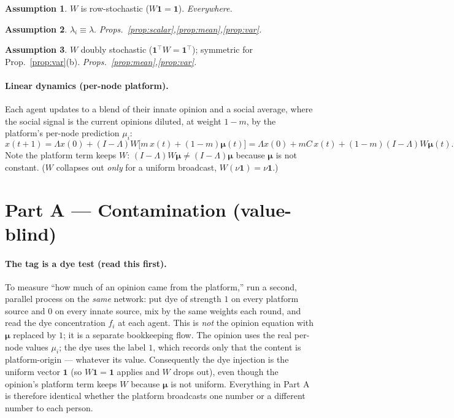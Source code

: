 \documentclass[11pt]{article}
\theoremstyle{definition}
\newtheorem{assumption}{Assumption}
\newcommand{\one}{\mathbf{1}}
\begin{document}
\begin{assumption}\label{a:row} $W$ is row-stochastic ($W\one=\one$). \emph{Everywhere.}\end{assumption}
\begin{assumption}\label{a:unif} $\lambda_i\equiv\lambda$. \emph{Props.~\ref{prop:scalar},\ref{prop:mean},\ref{prop:var}.}\end{assumption}
\begin{assumption}\label{a:ds} $W$ doubly stochastic ($\one^{\!\top}W=\one^{\!\top}$); symmetric for Prop.~\ref{prop:var}(b). \emph{Props.~\ref{prop:mean},\ref{prop:var}.}\end{assumption}

\paragraph{Linear dynamics (per-node platform).} Each agent updates to a blend of their
innate opinion and a social average, where the social signal is the current opinions
diluted, at weight $1-m$, by the platform's per-node prediction $\mu_i$:
\begin{equation}\label{eq:lin}
x(t+1)=\Lambda x(0)+(I-\Lambda)W\big[m\,x(t)+(1-m)\bm{\mu}(t)\big]
       =\Lambda x(0)+mC\,x(t)+(1-m)(I-\Lambda)W\bm{\mu}(t).
\end{equation}
Note the platform term keeps $W$: $(I-\Lambda)W\bm{\mu}\neq(I-\Lambda)\bm{\mu}$ because
$\bm{\mu}$ is not constant. ($W$ collapses out \emph{only} for a uniform broadcast,
$W(\nu\one)=\nu\one$.)

\section{Part A --- Contamination (value-blind)}

\paragraph{The tag is a dye test (read this first).} To measure ``how much of an
opinion came from the platform,'' run a second, parallel process on the \emph{same}
network: put dye of strength $1$ on every platform source and $0$ on every innate
source, mix by the same weights each round, and read the dye concentration $f_i$ at each
agent. This is \emph{not} the opinion equation with $\bm{\mu}$ replaced by $1$; it is a
separate bookkeeping flow. The opinion uses the real per-node values $\mu_i$; the dye
uses the label $1$, which records only that the content is platform-origin --- whatever
its value. Consequently the dye injection is the uniform vector $\one$ (so $W\one=\one$
applies and $W$ drops out), even though the opinion's platform term keeps $W$ because
$\bm{\mu}$ is not uniform. Everything in Part A is therefore identical whether the
platform broadcasts one number or a different number to each person.
\end{document}
